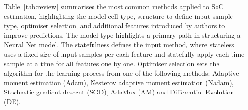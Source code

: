 %
%
\mbox{Table~\ref{tab:review}} summarises the most common methods applied to SoC estimation, highlighting the model cell type, structure to define input sample type, optimiser selection, and additional features introduced by authors to improve predictions.
The model type highlights a primary path in structuring a Neural Net model.
The statefulness defines the input method, where stateless uses a fixed size of input samples per each feature and statefully apply each time sample at a time for all features one by one.
Optimiser selection sets the algorithm for the learning process from one of the following methods: Adaptive moment estimation (Adam), Nesterov adaptive moment estimation  (Nadam), Stochastic gradient descent (SGD), AdaMax (AM) and Differential Evolution (DE).
\begin{table*}[h]
    \renewcommand{\arraystretch}{1.3}
    \caption{Reviewed papers implementation summary.}
    \centering
    \label{tab:review}
\end{table*}

